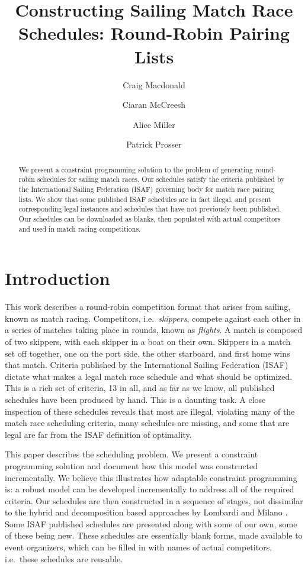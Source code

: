 \documentclass{llncs}
\begin{document}
\title{Constructing Sailing Match Race Schedules: Round-Robin Pairing Lists}
\author{Craig Macdonald \and Ciaran McCreesh \and Alice Miller \and Patrick Prosser}
\maketitle

\begin{abstract}
We present a constraint programming solution to the problem of generating round-robin schedules for sailing match races. Our schedules satisfy the criteria published by the International Sailing Federation (ISAF) governing body for match race pairing lists. We show that some published ISAF schedules are in fact illegal, and present
corresponding legal instances and schedules that have not previously been published. Our schedules
can be downloaded as blanks, then populated with actual competitors and used in match racing competitions.
\end{abstract}

\section{Introduction}
This work describes a round-robin competition format that arises from sailing, known as match
racing. Competitors, i.e.\ \emph{skippers}, compete against each other in a series of matches taking
place in rounds, known as \emph{flights}.  A match is composed of two skippers, with each skipper in
a boat on their own. Skippers in a match set off together, one on the port side, the other starboard,
and first home wins that match. Criteria published by the International Sailing Federation (ISAF)
dictate what makes a legal match race schedule and what should be optimized. This is a rich set of
criteria, 13 in all, and as far as we know, all published schedules have been produced by hand. This
is a daunting task. A close inspection of these schedules reveals that most are illegal, violating
many of the match race scheduling criteria, many schedules are missing, and some that are legal are
far from the ISAF definition of optimality.

This paper describes the scheduling problem. We present a constraint programming solution and
document how this model was constructed incrementally. We believe this illustrates how adaptable
constraint programming is: a robust model can be developed incrementally to address all of the
required criteria. Our schedules are then constructed in a sequence of stages, not dissimilar to the
hybrid and decomposition based approaches by Lombardi and Milano \cite{lombardi2012}. Some ISAF
published schedules are presented along with some of our own, some of these being new.  These
schedules are essentially blank forms, made available to event organizers, which can be filled in
with names of actual competitors, i.e.\ these schedules are reusable.
\end{document}
